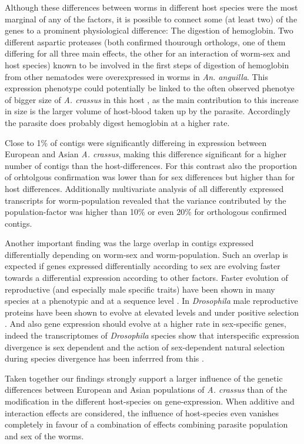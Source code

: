 Although these differences between worms in different host species
were the most marginal of any of the factors, it is possible to
connect some (at least two) of the genes to a prominent physiological
difference: The digestion of hemoglobin. Two different aspartic
proteases (both confirmed thourough orthologs, one of them differing
for all three main effects, the other for an interaction of worm-sex
and host species) known to be involved in the first steps of digestion
of hemoglobin from other nematodes \cite{pmid12782060} were
overexpressed in worms in \textit{An. anguilla}. This expression
phenotype could potentially be linked to the often observed phenotye
of bigger size of \textit{A. crassus} in this host
\cite{knopf_swimbladder_2006}, as the main contribution to this
increase in size is the larger volume of host-blood taken up by the
parasite. Accordingly the parasite does probably digest hemoglobin at
a higher rate.

Close to 1\% of contigs were significantly differeing in expression
between European and Asian \textit{A. crassus}, making this difference
significant for a higher number of contigs than the
host-differences. For this contrast also the proportion of orhtolgous
confirmation was lower than for sex differences but higher than for
host differences. Additionally multivariate analysis of all
differently expressed transcripts for worm-population revealed that
the variance contributed by the population-factor was higher than 10\%
or even 20\% for orthologous confirmed contigs.

Another important finding was the large overlap in contigs expressed
differentially depending on worm-sex and worm-population. Such an
overlap is expected if genes expressed differentially according to sex
are evolving faster towards a differential expression according to
other factors. Faster evolution of reproductive (and especially male
specific traits) have been shown in many species at a phenotypic and
at a sequence level \cite{pmid15795858}. In \textit{Drosophila} male
reproductive proteins have been shown to evolve at elevated levels and
under positive selection \cite{pmid11404480}. And also gene expression
should evolve at a higher rate in sex-specific genes, indeed the
transcriptomes of \textit{Drosophila} species show that interspecific
expression divergence is sex dependent and the action of sex-dependent
natural selection during species divergence has been inferrred from
this \cite{pmid15034135,pmid19720861}.

Taken together our findings strongly support a larger influence of the
genetic differences between European and Asian populations of
\textit{A. crassus} than of the modification in the different
host-species on gene-expression. When additive and interaction effects
are considered, the influence of host-species even vanishes completely
in favour of a combination of effects combining parasite population
and sex of the worms.

